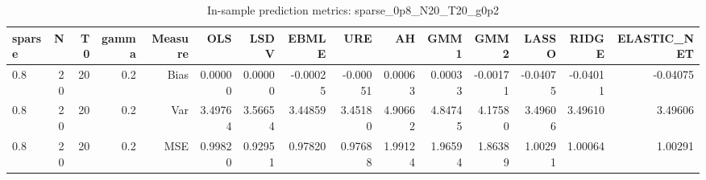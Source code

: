 \begin{table}[!htbp]\centering
\caption{In-sample prediction metrics: sparse_0p8_N20_T20_g0p2}
\label{tab:table2_sparse_0p8_N20_T20_g0p2}
\begin{tabular}{lrrrrrrrrrrrrrr}
\hline
sparse & N & T0 & gamma & Measure & OLS & LSDV & EBMLE & URE & AH & GMM1 & GMM2 & LASSO & RIDGE & ELASTIC_NET \\
\hline
0.8 & 20 & 20 & 0.2 & Bias & 0.00000 & 0.00000 & -0.00025 & -0.00051 & 0.00063 & 0.00033 & -0.00171 & -0.04075 & -0.04011 & -0.04075 \\
0.8 & 20 & 20 & 0.2 & Var & 3.49764 & 3.56654 & 3.44859 & 3.45180 & 4.90662 & 4.84745 & 4.17580 & 3.49606 & 3.49610 & 3.49606 \\
0.8 & 20 & 20 & 0.2 & MSE & 0.99820 & 0.92951 & 0.97820 & 0.97688 & 1.99124 & 1.96594 & 1.86389 & 1.00291 & 1.00064 & 1.00291 \\
\hline
\end{tabular}
\end{table}

